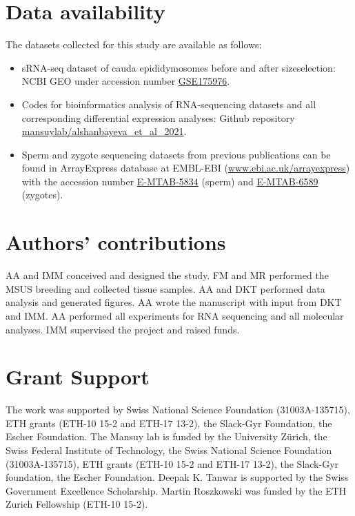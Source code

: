 \documentclass[12pt,twoside]{reedthesis}
\begin{document}
\hypertarget{data-availability}{%
\section{Data availability}\label{data-availability}}

The datasets collected for this study are available as follows:
\begin{itemize}
\item
  sRNA-seq dataset of cauda epididymosomes before and after
  sizeselection: NCBI GEO under accession number
  \href{https://www.ncbi.nlm.nih.gov/geo/query/acc.cgi?acc=GSE175976}{GSE175976}.
\item
  Codes for bioinformatics analysis of RNA-sequencing datasets and all
  corresponding differential expression analyses: Github repository
  \href{https://github.com/mansuylab/alshanbayeva_et_al_2021}{mansuylab/alshanbayeva\_et\_al\_2021}.
\item
  Sperm and zygote sequencing datasets from previous publications can
  be found in ArrayExpress database at EMBL-EBI
  (\url{www.ebi.ac.uk/arrayexpress}) with the
  accession number
  \href{https://www.ebi.ac.uk/arrayexpress/experiments/E-MTAB-5834/}{E-MTAB-5834}
  (sperm) and
  \href{https://www.ebi.ac.uk/arrayexpress/experiments/E-MTAB-6589/}{E-MTAB-6589}
  (zygotes).
\end{itemize}
\newpage

\hypertarget{authors-contributions}{%
\section{Authors' contributions}\label{authors-contributions}}

AA and IMM conceived and designed the study. FM and MR performed the
MSUS breeding and collected tissue samples. AA and DKT performed data
analysis and generated figures. AA wrote the manuscript with input from
DKT and IMM. AA performed all experiments for RNA sequencing and all
molecular analyses. IMM supervised the project and raised funds.

\hypertarget{grant-support}{%
\section{Grant Support}\label{grant-support}}

The work was supported by Swiss National Science Foundation
(31003A-135715), ETH grants (ETH-10 15-2 and ETH-17 13-2), the Slack-Gyr
Foundation, the Escher Foundation. The Mansuy lab is funded by the
University Zürich, the Swiss Federal Institute of Technology, the Swiss
National Science Foundation (31003A-135715), ETH grants (ETH-10 15-2 and
ETH-17 13-2), the Slack-Gyr foundation, the Escher Foundation. Deepak K.
Tanwar is supported by the Swiss Government Excellence Scholarship.
Martin Roszkowski was funded by the ETH Zurich Fellowship (ETH-10 15-2).
\end{document}
